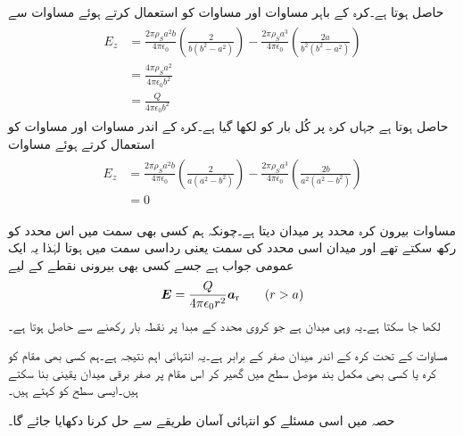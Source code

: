 حاصل ہوتا ہے۔کرہ کے باہر مساوات  اور مساوات   کو استعمال کرتے ہوئے مساوات  سے
\begin{gather}
\begin{aligned}\label{مساوات_کولمب_کرہ_بار_کا_میدان_ب}
E_z&=\frac{2 \pi\rho_S a^2 b}{4 \pi \epsilon_0} \left(\frac{2}{b(b^2-a^2)}\right)-\frac{2 \pi\rho_S a^3}{4 \pi \epsilon_0} \left(\frac{2a}{b^2(b^2-a^2)}\right)\\
&=\frac{4 \pi \rho_S a^2}{4\pi \epsilon_0 b^2}\\
&=\frac{Q}{4\pi \epsilon_0 b^2}
\end{aligned}
\end{gather}
حاصل ہوتا ہے جہاں  کرہ پر کُل بار  کو  لکھا گیا ہے۔کرہ کے اندر مساوات  اور مساوات   کو استعمال کرتے ہوئے مساوات 
\begin{gather}
\begin{aligned}\label{مساوات_کولمب_کرہ_بار_کا_میدان_پ}
E_z&=\frac{2 \pi\rho_S a^2 b}{4 \pi \epsilon_0} \left(\frac{2}{a(a^2-b^2)}\right)-\frac{2 \pi\rho_S a^3}{4 \pi \epsilon_0} \left(\frac{2b}{a^2(a^2-b^2)}\right)\\
&=0
\end{aligned}
\end{gather}

مساوات  بیرون کرہ  محدد پر میدان دیتا ہے۔چونکہ ہم کسی بھی سمت میں اس محدد کو رکھ سکتے تھے اور میدان اسی محدد کی سمت یعنی رداسی سمت میں ہوتا  لہٰذا یہ ایک عمومی جواب ہے جسے کسی بھی بیرونی نقطے کے لیے
\begin{align}
{\ensuremath{{\boldsymbol{E}}}}=\frac{Q}{4\pi \epsilon_0 r^2} {\boldsymbol{a}}_{\textup{r}}  \quad \quad (r>a)
\end{align}
لکھا جا سکتا ہے۔یہ وہی میدان ہے جو کروی محدد کے مبدا پر  نقطہ بار رکھنے سے حاصل ہوتا ہے۔

مساوات  کے تحت کرہ کے اندر میدان صفر کے برابر ہے۔یہ انتہائی اہم نتیجہ ہے۔ہم کسی بھی مقام کو کرہ یا کسی بھی مکمل بند موصل سطح میں گھیر کر اس مقام پر صفر برقی میدان یقینی بنا سکتے ہیں۔ایسی سطح کو  کہتے ہیں۔

حصہ  میں اسی مسئلے کو انتہائی آسان طریقے سے حل کرنا دکھایا جائے گا۔

